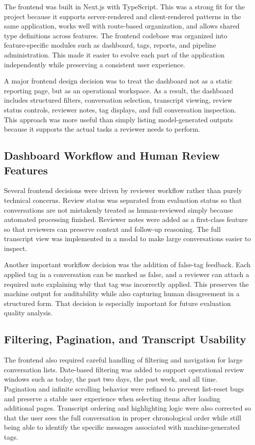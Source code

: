 \documentclass[12pt]{article}
\begin{document}
	The frontend was built in Next.js with TypeScript. This was a strong fit for the project because it supports server-rendered and client-rendered patterns in the same application, works well with route-based organization, and allows shared type definitions across features. The frontend codebase was organized into feature-specific modules such as dashboard, tags, reports, and pipeline administration. This made it easier to evolve each part of the application independently while preserving a consistent user experience.
	
	A major frontend design decision was to treat the dashboard not as a static reporting page, but as an operational workspace. As a result, the dashboard includes structured filters, conversation selection, transcript viewing, review status controls, reviewer notes, tag displays, and full conversation inspection. This approach was more useful than simply listing model-generated outputs because it supports the actual tasks a reviewer needs to perform.
	
	\subsection{Dashboard Workflow and Human Review Features}
	
	Several frontend decisions were driven by reviewer workflow rather than purely technical concerns. Review status was separated from evaluation status so that conversations are not mistakenly treated as human-reviewed simply because automated processing finished. Reviewer notes were added as a first-class feature so that reviewers can preserve context and follow-up reasoning. The full transcript view was implemented in a modal to make large conversations easier to inspect.
	
	Another important workflow decision was the addition of false-tag feedback. Each applied tag in a conversation can be marked as false, and a reviewer can attach a required note explaining why that tag was incorrectly applied. This preserves the machine output for auditability while also capturing human disagreement in a structured form. That decision is especially important for future evaluation quality analysis.
	
	\subsection{Filtering, Pagination, and Transcript Usability}
	
	The frontend also required careful handling of filtering and navigation for large conversation lists. Date-based filtering was added to support operational review windows such as today, the past two days, the past week, and all time. Pagination and infinite scrolling behavior were refined to prevent list-reset bugs and preserve a stable user experience when selecting items after loading additional pages. Transcript ordering and highlighting logic were also corrected so that the user sees the full conversation in proper chronological order while still being able to identify the specific messages associated with machine-generated tags.
	
\end{document}
